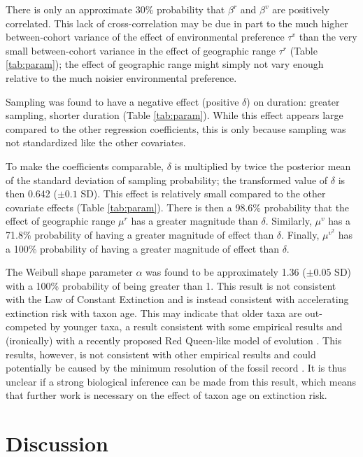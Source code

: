 \documentclass{article}
\begin{document}
There is only an approximate 30\% probability that \(\beta^{r}\) and \(\beta^{v}\) are positively correlated. This lack of cross-correlation may be due in part to the much higher between-cohort variance of the effect of environmental preference \(\tau^{v}\) than the very small between-cohort variance in the effect of geographic range \(\tau^{r}\) (Table \ref{tab:param}); the effect of geographic range might simply not vary enough relative to the much noisier environmental preference.

Sampling was found to have a negative effect (positive \(\delta\)) on duration: greater sampling, shorter duration (Table \ref{tab:param}). While this effect appears large compared to the other regression coefficients, this is only because sampling was not standardized like the other covariates. 

To make the coefficients comparable, \(\delta\) is multiplied by twice the posterior mean of the standard deviation of sampling probability; the transformed value of \(\delta\) is then 0.642 (\(\pm 0.1\) SD). This effect is relatively small compared to the other covariate effects (Table \ref{tab:param}). There is then a 98.6\% probability that the effect of geographic range \(\mu^{r}\) has a greater magnitude than \(\delta\). Similarly, \(\mu^{v}\) has a 71.8\% probability of having a greater magnitude of effect than \(\delta\). Finally, \(\mu^{v^{2}}\) has a 100\% probability of having a greater magnitude of effect than \(\delta\).

The Weibull shape parameter \(\alpha\) was found to be approximately 1.36 (\(\pm 0.05\) SD) with a 100\% probability of being greater than 1. This result is not consistent with the Law of Constant Extinction \citep{VanValen1973} and is instead consistent with accelerating extinction risk with taxon age. This may indicate that older taxa are out-competed by younger taxa, a result consistent with some empirical results \citep{Wagner2014b,Quental2013,Smits2015} and (ironically) with a recently proposed Red Queen-like model of evolution \citep{Rosindell2015a}. This results, however, is not consistent with other empirical results \citep{Finnegan2008,Crampton2016} and could potentially be caused by the minimum resolution of the fossil record \citep{Sepkoski1975}. It is thus unclear if a strong biological inference can be made from this result, which means that further work is necessary on the effect of taxon age on extinction risk.


\section{Discussion}
\end{document}

